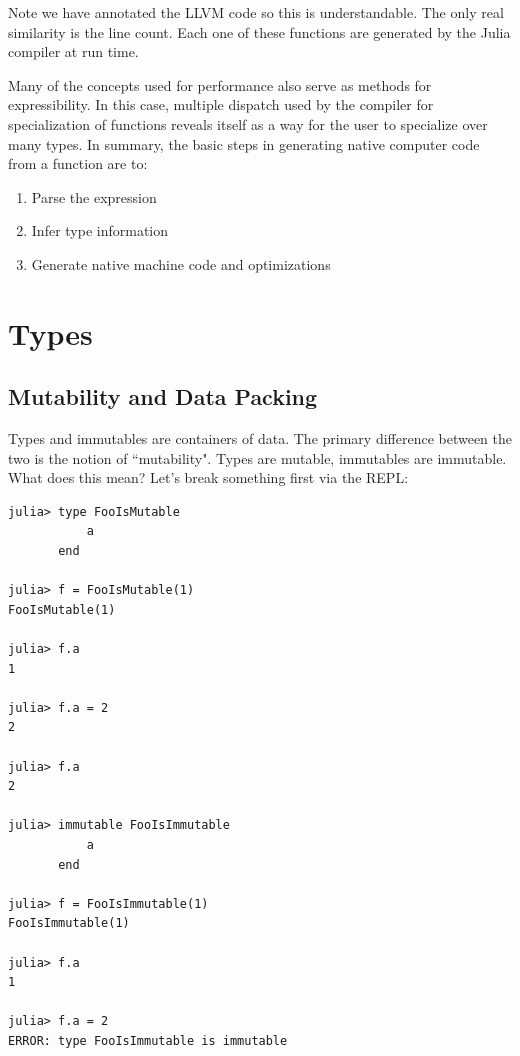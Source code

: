 Note we have annotated the LLVM code so this is understandable. 
The only real similarity is the line count. Each one of these functions are generated by the
Julia compiler at run time.

Many of the concepts used for performance also serve as methods for
expressibility. In this case, multiple dispatch used by the compiler for
specialization of functions reveals itself as a way for the user to
specialize over many types. In summary, the
basic steps in generating native computer code from a function are to:
\begin{enumerate}
\item Parse the expression
\item Infer type information
\item Generate native machine code and optimizations
\end{enumerate}

\section{Types}

\subsection{Mutability and Data Packing}
Types and immutables are containers of data. The primary difference between
the two is the notion of ``mutability". Types are mutable, immutables are 
immutable. What does this mean? Let's break something first via the REPL:
\begin{lstlisting}
julia> type FooIsMutable
           a
       end

julia> f = FooIsMutable(1)
FooIsMutable(1)

julia> f.a
1

julia> f.a = 2
2

julia> f.a
2

julia> immutable FooIsImmutable
           a
       end

julia> f = FooIsImmutable(1)
FooIsImmutable(1)

julia> f.a
1

julia> f.a = 2
ERROR: type FooIsImmutable is immutable
\end{lstlisting}

